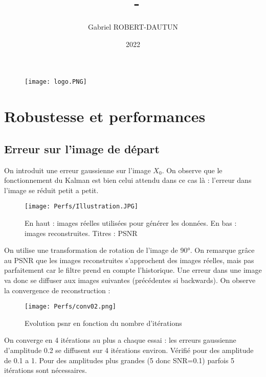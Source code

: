 \documentclass[titlepage]{article}
\author{Gabriel ROBERT-DAUTUN}
\date{2022}
\title{%
	\UE\, - \type\ifthenelse{\nb > 0}{\nb}{} \\
	\large \sbt}
\begin{document}
	
	\begin{figure}
		\centering
		\texttt{[image: logo.PNG]}
		\label{fig:logo}
	\end{figure}
	\maketitle
	
	\newpage
	\tableofcontents
	
	\newpage
	\section{Robustesse et performances}
	\subsection{Erreur sur l'image de départ}
	On introduit une erreur gaussienne sur l'image $X_0$. On observe que le fonctionnement du Kalman est bien celui attendu dans ce cas là : l'erreur dans l'image se réduit petit a petit.
	
	\begin{figure}[H]
		\centering
		\texttt{[image: Perfs/Illustration.JPG]}
		\caption{En haut : images réelles utilisées pour générer les données. En bas : images reconstruites. Titres : PSNR}
	\end{figure}

	On utilise une transformation de rotation de l'image de 90°. On remarque grâce au PSNR que les images reconstruites s'approchent des images réelles, mais pas parfaitement car le filtre prend en compte l'historique. Une erreur dans une image va donc se diffuser aux images suivantes (précédentes si backwards). On observe la convergence de reconstruction :
	
	\begin{figure}[H]
		\centering
		\texttt{[image: Perfs/conv02.png]}
		\caption{Evolution psnr en fonction du nombre d'itérations}
	\end{figure}

	On converge en 4 itérations au plus a chaque essai : les erreurs gaussienne d'amplitude 0.2 se diffusent sur 4 itérations environ.
	Vérifié pour des amplitude de 0.1 a 1. Pour des amplitudes plus grandes (5 donc SNR=0.1) parfois 5 itérations sont nécessaires.
	
\end{document}
